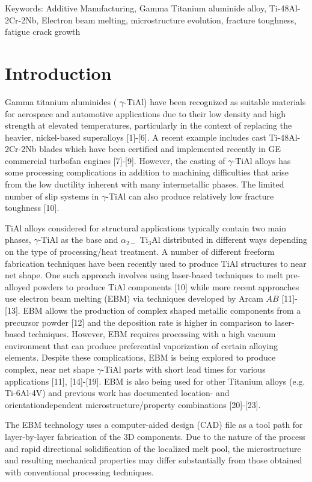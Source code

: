 \documentclass[10pt]{article}
\begin{document}
Keywords: Additive Manufacturing, Gamma Titanium aluminide alloy, Ti-48Al-2Cr-2Nb, Electron beam melting, microstructure evolution, fracture toughness, fatigue crack growth

\section*{Introduction}
Gamma titanium aluminides ( $\gamma$-TiAl) have been recognized as suitable materials for aerospace and automotive applications due to their low density and high strength at elevated temperatures, particularly in the context of replacing the heavier, nickel-based superalloys [1]-[6]. A recent example includes cast Ti-48Al-2Cr-2Nb blades which have been certified and implemented recently in GE commercial turbofan engines [7]-[9]. However, the casting of $\gamma$-TiAl alloys has some processing complications in addition to machining difficulties that arise from the low ductility inherent with many intermetallic phases. The limited number of slip systems in $\gamma$-TiAl can also produce relatively low fracture toughness [10].

TiAl alloys considered for structural applications typically contain two main phases, $\gamma$-TiAl as the base and $\alpha_{2-}$ $\mathrm{Ti}_{3} \mathrm{Al}$ distributed in different ways depending on the type of processing/heat treatment. A number of different freeform fabrication techniques have been recently used to produce TiAl structures to near net shape. One such approach involves using laser-based techniques to melt pre-alloyed powders to produce TiAl components [10] while more recent approaches use electron beam melting (EBM) via techniques developed by Arcam $A B$ [11]-[13]. EBM allows the production of complex shaped metallic components from a precursor powder [12] and the deposition rate is higher in comparison to laser-based techniques. However, EBM requires processing with a high vacuum environment that can produce preferential vaporization of certain alloying elements. Despite these complications, EBM is being explored to produce complex, near net shape $\gamma$-TiAl parts with short lead times for various applications [11], [14]-[19]. EBM is also being used for other Titanium alloys (e.g. Ti-6Al-4V) and previous work has documented location- and orientationdependent microstructure/property combinations [20]-[23].

The EBM technology uses a computer-aided design (CAD) file as a tool path for layer-by-layer fabrication of the 3D components. Due to the nature of the process and rapid directional solidification of the localized melt pool, the microstructure and resulting mechanical properties may differ substantially from those obtained with conventional processing techniques.
\end{document}
